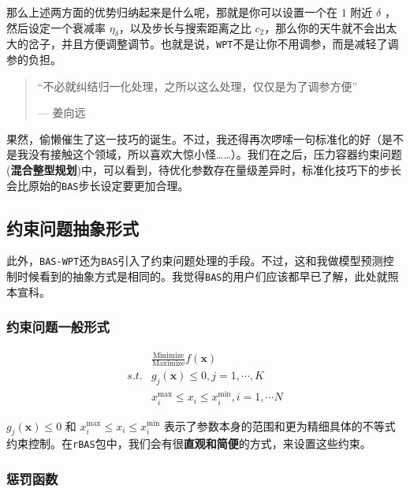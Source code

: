 \documentclass[]{ctexbook}
\theoremstyle{definition}
\theoremstyle{definition}
\theoremstyle{definition}
\theoremstyle{remark}
\begin{document}
那么上述两方面的优势归纳起来是什么呢，那就是你可以设置一个在 \(1\) 附近
\(\delta\) ，然后设定一个衰减率
\(\eta_{\delta}\)，以及步长与搜索距离之比
\(c_2\)，那么你的天牛就不会出太大的岔子，并且方便调整调节。也就是说，\texttt{WPT}不是让你不用调参，而是减轻了调参的负担。

\begin{quote}
``不必就纠结归一化处理，之所以这么处理，仅仅是为了调参方便''

\begin{flushright}--- 姜向远\end{flushright}
\end{quote}

果然，偷懒催生了这一技巧的诞生。不过，我还得再次啰嗦一句标准化的好（是不是我没有接触这个领域，所以喜欢大惊小怪\ldots{}\ldots{}）。我们在之后，压力容器约束问题(\textbf{混合整型规划})中，可以看到，待优化参数存在量级差异时，标准化技巧下的步长会比原始的\texttt{BAS}步长设定要更加合理。

\subsection{约束问题抽象形式}\label{constrform}

此外，\texttt{BAS-WPT}还为\texttt{BAS}引入了约束问题处理的手段。不过，这和我做模型预测控制时候看到的抽象方式是相同的。我觉得\texttt{BAS}的用户们应该都早已了解，此处就照本宣科。

\subsubsection{约束问题一般形式}

\begin{equation}
\begin{split}
& \frac{\text{Minimize}}{\text{Maximize}} f(\mathbf{x}) \\
s.t.  & g_j(\mathbf{x})\leq 0, j=1, \cdots, K \\
& x^\text{max}_i \leq x_i \leq x^\text{min}_i, i=1, \cdots N
\end{split}
\label{eq:ConProb}
\end{equation}

\(g_j(\mathbf{x})\leq 0\) 和
\(x^\text{max}_i \leq x_i \leq x^\text{min}_i\)
表示了参数本身的范围和更为精细具体的不等式约束控制。在\texttt{rBAS}包中，我们会有很\textbf{直观和简便}的方式，来设置这些约束。

\subsubsection{惩罚函数}
\end{document}
